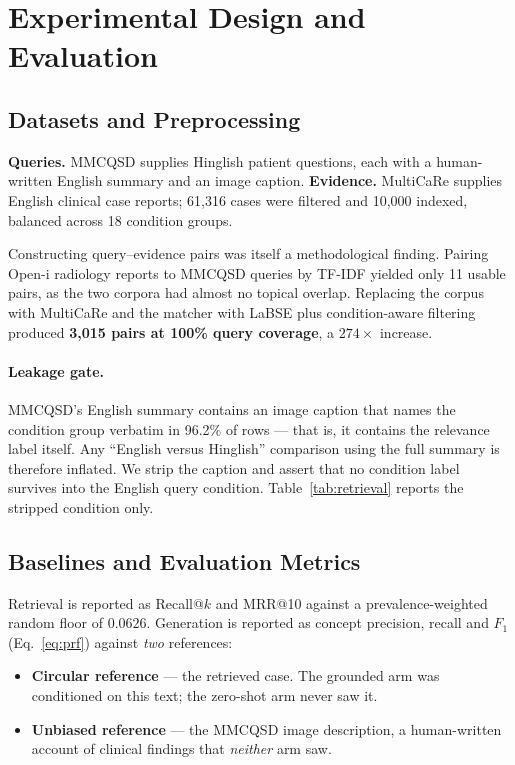 \documentclass[pdflatex,sn-mathphys-num]{sn-jnl}
\theoremstyle{thmstyleone}
\theoremstyle{thmstyletwo}
\theoremstyle{thmstylethree}
\begin{document}
\section{Experimental Design and Evaluation}\label{sec:experiments}

\subsection{Datasets and Preprocessing}\label{subsec:data}

\textbf{Queries.} MMCQSD supplies Hinglish patient questions, each with a
human-written English summary and an image caption. \textbf{Evidence.} MultiCaRe
supplies English clinical case reports; 61,316 cases were filtered and 10,000 indexed,
balanced across 18 condition groups.

Constructing query--evidence pairs was itself a methodological finding. Pairing Open-i
radiology reports to MMCQSD queries by TF-IDF yielded only 11 usable pairs, as the two
corpora had almost no topical overlap. Replacing the corpus with MultiCaRe and the
matcher with LaBSE plus condition-aware filtering produced \textbf{3,015 pairs at 100\%
query coverage}, a $274\times$ increase.

\paragraph{Leakage gate.} MMCQSD's English summary contains an image caption that names
the condition group verbatim in 96.2\% of rows --- that is, it contains the relevance
label itself. Any ``English versus Hinglish'' comparison using the full summary is
therefore inflated. We strip the caption and assert that no condition label survives
into the English query condition. Table~\ref{tab:retrieval} reports the stripped
condition only.

\subsection{Baselines and Evaluation Metrics}\label{subsec:metrics}

Retrieval is reported as Recall@$k$ and MRR@10 against a prevalence-weighted random
floor of $0.0626$. Generation is reported as concept precision, recall and $F_1$
(Eq.~\ref{eq:prf}) against \emph{two} references:

\begin{itemize}
\item \textbf{Circular reference} --- the retrieved case. The grounded arm was
conditioned on this text; the zero-shot arm never saw it.
\item \textbf{Unbiased reference} --- the MMCQSD image description, a human-written
account of clinical findings that \emph{neither} arm saw.
\end{itemize}
\end{document}
